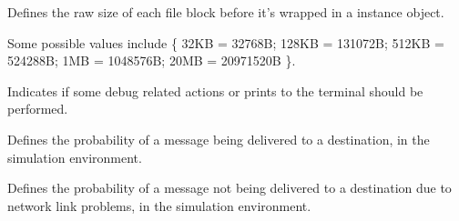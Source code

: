 \documentclass[letterpaper,10pt,english]{sphinxmanual}
\begin{document}
\begin{fulllineitems}
\label{\detokenize{app:app.environment_settings.BLOCKS_SIZE}}
Defines the raw size of each file block before it’s wrapped in a
{\hyperref[\detokenize{app.domain.helpers:app.domain.helpers.smart_dataclasses.FileBlockData}]{}} instance
object.

Some possible values include \{ 32KB = 32768B; 128KB = 131072B; 512KB = 524288B;
1MB = 1048576B; 20MB = 20971520B \}.

\end{fulllineitems}


\begin{fulllineitems}
\label{\detokenize{app:app.environment_settings.DEBUG}}
Indicates if some debug related actions or prints to the terminal should
be performed.

\end{fulllineitems}


\begin{fulllineitems}
\label{\detokenize{app:app.environment_settings.DELIVER_CHANCE}}
Defines the probability of a message being delivered to a destination,
in the simulation environment.

\end{fulllineitems}


\begin{fulllineitems}
\label{\detokenize{app:app.environment_settings.LOSS_CHANCE}}
Defines the probability of a message not being delivered to a destination
due to network link problems, in the simulation environment.

\end{fulllineitems}
\end{document}
